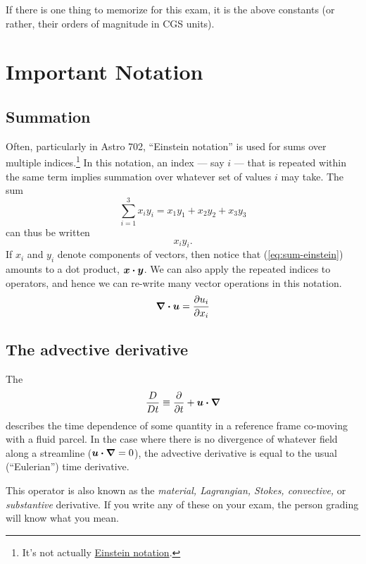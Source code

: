 If there is one thing to memorize for this exam, it is the above constants (or rather, their orders of magnitude in CGS units).


\section{Important Notation}
\subsection{Summation}
Often, particularly in Astro 702, ``Einstein notation'' is used for sums over multiple indices.\footnote{It's not actually \href{https://en.wikipedia.org/wiki/Einstein_notation}{Einstein notation}.} In this notation, an index --- say $i$ --- that is repeated within the same term implies summation over whatever set of values $i$ may take. The sum
\begin{equation}
    \sum_{i=1}^3 x_i y_i = x_1 y_1 + x_2 y_2 + x_3 y_3
\end{equation}
can thus be written
\begin{equation} \label{eq:sum-einstein}
    x_i y_i.
\end{equation}
If $x_i$ and $y_i$ denote components of vectors, then notice that (\ref{eq:sum-einstein}) amounts to a dot product, $\vb*{x} \vdot \vb*{y}$. We can also apply the repeated indices to operators, and hence we can re-write many vector operations in this notation.
\begin{align}
    \div{\vb*{u}} = \pdv{u_i}{x_i}
\end{align}

\subsection{The advective derivative}
The 
\begin{align} \label{eq:advective-derivative}
    \mdv{} \equiv \pdv{t} + \vb*{u} \vdot \grad{}
\end{align}
describes the time dependence of some quantity in a reference frame co-moving with a fluid parcel. In the case where there is no divergence of whatever field along a streamline ($\vb*{u} \vdot \grad{} = 0$), the advective derivative is equal to the usual (``Eulerian'') time derivative.

This operator is also known as the \textit{material, Lagrangian, Stokes, convective,} or \textit{substantive} derivative. If you write any of these on your exam, the person grading will know what you mean.


